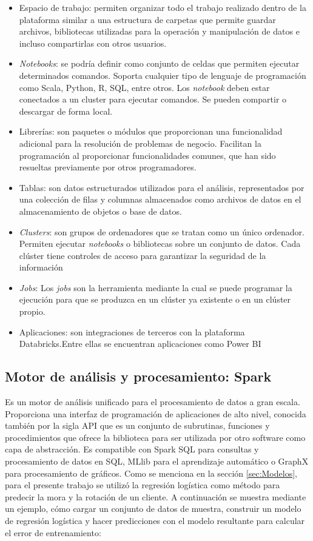 \begin{itemize}
\item Espacio de trabajo: permiten organizar todo el trabajo realizado dentro de la plataforma similar a una estructura de carpetas que permite guardar archivos, bibliotecas utilizadas para la operación y manipulación de datos e incluso compartirlas con otros usuarios.
\item \textit{Notebooks}: se podría definir como conjunto de celdas que permiten ejecutar determinados comandos. Soporta cualquier tipo de lenguaje de programación como Scala, Python, R, SQL, entre otros. Los \textit{notebook} deben estar conectados a un cluster para ejecutar comandos. Se pueden compartir o descargar de forma local.
\item Librerías: son paquetes o módulos que proporcionan una funcionalidad adicional para la resolución de problemas de negocio. Facilitan la programación al proporcionar funcionalidades comunes, que han sido resueltas previamente por otros programadores.
\item Tablas: son datos estructurados utilizados para el análisis, representados por una colección de filas y columnas almacenados como archivos de datos en el almacenamiento de objetos o base de datos.
\item \textit{Clusters}: son grupos de ordenadores que se tratan como un único ordenador. Permiten ejecutar \textit{notebooks} o bibliotecas sobre un conjunto de datos. Cada clúster tiene controles de acceso para garantizar la seguridad de la información 
\item \textit{Jobs}: Los \textit{jobs} son la herramienta mediante la cual se puede programar la ejecución para que se produzca en un clúster ya existente o en un clúster propio. 
\item Aplicaciones: son integraciones de terceros con la plataforma Databricks.Entre ellas se encuentran aplicaciones como Power BI
\end{itemize}
 
\subsection{Motor de análisis y procesamiento: Spark}
Es un motor de análisis unificado para el procesamiento de datos a gran escala. Proporciona una interfaz de programación de aplicaciones de alto nivel, conocida también por la sigla API que es un conjunto de subrutinas, funciones y procedimientos que ofrece la biblioteca para ser utilizada por otro software como capa de abstracción. 
Es compatible con Spark SQL para consultas y procesamiento de datos en SQL, MLlib para el aprendizaje automático o GraphX para procesamiento de gráficos.
Como se menciona en la sección \ref{sec:Modelos}, para el presente trabajo se utilizó la regresión logística como método para predecir la mora y la rotación de un cliente. A continuación se muestra mediante un ejemplo, cómo cargar un conjunto de datos de muestra, construir un modelo de regresión logística y hacer predicciones con el modelo resultante para calcular el error de entrenamiento:


